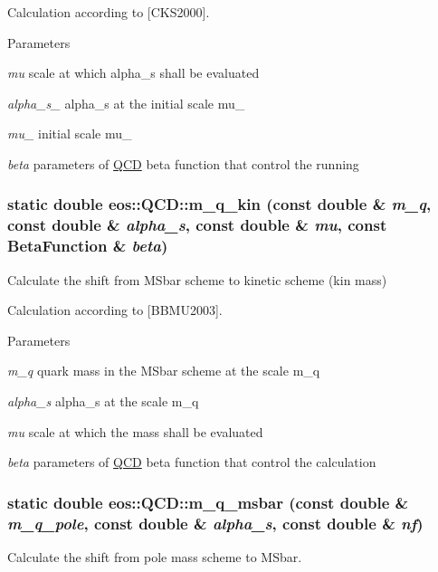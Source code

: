 Calculation according to \mbox{[}CKS2000\mbox{]}.


\begin{DoxyParams}{Parameters}
\item[{\em mu}]scale at which alpha\_\-s shall be evaluated \item[{\em alpha\_\-s\_\-0}]alpha\_\-s at the initial scale mu\_ \item[{\em mu\_\-0}]initial scale mu\_ \item[{\em beta}]parameters of \hyperlink{classeos_1_1QCD}{QCD} beta function that control the running \end{DoxyParams}
\hypertarget{classeos_1_1QCD_ad4ddd12454ebee7271a0245b9fbabdfa}{
\subsubsection[{m\_\-q\_\-kin}]{\setlength{\rightskip}{0pt plus 5cm}static double eos::QCD::m\_\-q\_\-kin (const double \& {\em m\_\-q}, \/  const double \& {\em alpha\_\-s}, \/  const double \& {\em mu}, \/  const {\bf BetaFunction} \& {\em beta})}}
\label{classeos_1_1QCD_ad4ddd12454ebee7271a0245b9fbabdfa}
Calculate the shift from MSbar scheme to kinetic scheme (kin mass)

Calculation according to \mbox{[}BBMU2003\mbox{]}.


\begin{DoxyParams}{Parameters}
\item[{\em m\_\-q}]quark mass in the MSbar scheme at the scale m\_\-q \item[{\em alpha\_\-s}]alpha\_\-s at the scale m\_\-q \item[{\em mu}]scale at which the mass shall be evaluated \item[{\em beta}]parameters of \hyperlink{classeos_1_1QCD}{QCD} beta function that control the calculation \end{DoxyParams}
\hypertarget{classeos_1_1QCD_a8b164d1c0acdf564198a3535539f281f}{
\subsubsection[{m\_\-q\_\-msbar}]{\setlength{\rightskip}{0pt plus 5cm}static double eos::QCD::m\_\-q\_\-msbar (const double \& {\em m\_\-q\_\-pole}, \/  const double \& {\em alpha\_\-s}, \/  const double \& {\em nf})}}
\label{classeos_1_1QCD_a8b164d1c0acdf564198a3535539f281f}
Calculate the shift from pole mass scheme to MSbar.

